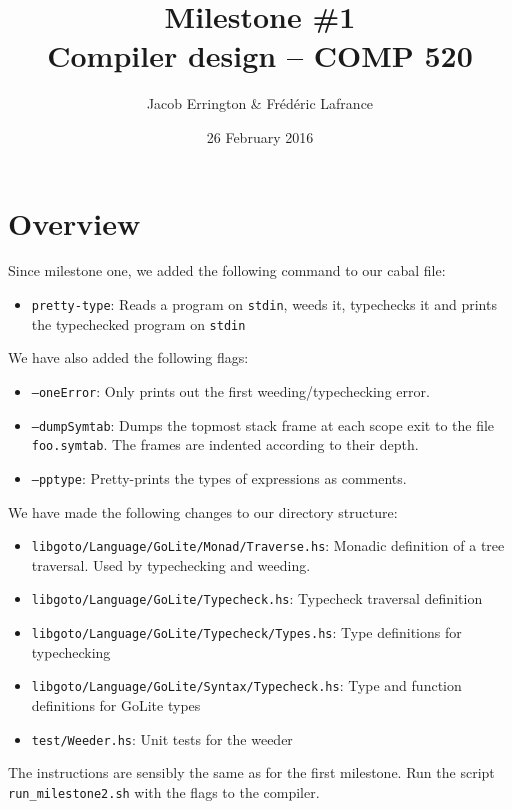 \documentclass[letterpaper,11pt]{article}
\title{Milestone \#1\\Compiler design -- COMP 520}
\author{Jacob Errington \& Fr\'ed\'eric Lafrance}
\date{26 February 2016}
\begin{document}
\maketitle

\section{Overview}
Since milestone one, we added the following command to our cabal file:
\begin{itemize}
\item\texttt{pretty-type}: Reads a program on \texttt{stdin}, weeds it, typechecks it and prints the typechecked program on \texttt{stdin}
\end{itemize}

We have also added the following flags:
\begin{itemize}
\item\texttt{--oneError}: Only prints out the first weeding/typechecking error.
\item\texttt{--dumpSymtab}: Dumps the topmost stack frame at each scope exit to the file \texttt{foo.symtab}. The frames are indented according to their depth.
\item\texttt{--pptype}: Pretty-prints the types of expressions as comments.
\end{itemize}

We have made the following changes to our directory structure:
\begin{itemize}
\item \texttt{libgoto/Language/GoLite/Monad/Traverse.hs}: Monadic definition of a tree traversal. Used by typechecking and weeding.
\item \texttt{libgoto/Language/GoLite/Typecheck.hs}: Typecheck traversal definition
\item \texttt{libgoto/Language/GoLite/Typecheck/Types.hs}: Type definitions for typechecking
\item \texttt{libgoto/Language/GoLite/Syntax/Typecheck.hs}: Type and function definitions for GoLite types
\item \texttt{test/Weeder.hs}: Unit tests for the weeder
\end{itemize}

The instructions are sensibly the same as for the first milestone. Run the script \texttt{run\_milestone2.sh} with the flags to the compiler.
\end{document}
